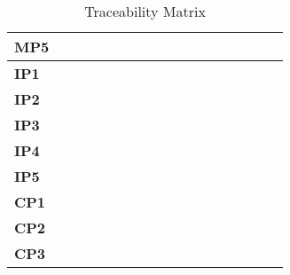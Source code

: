 \documentclass[12pt]{article}
\begin{document}
\begin{table}[H]
\begin{adjustwidth}{-0.1in}{-1in}
{\begin{tabular}{c|c|c|c|c|c|c|c|c|c|c|c|c|c|c|c|c|}
\multicolumn{1}{|l|}{\textbf{MP5}}   &              &              &              &              &              &              &              &              &              &              &              &              &              &              &             &              \\ \hline
\multicolumn{1}{|l|}{\textbf{IP1}}   &              &              &              &              &              &              &              &              &              &              &              &              &              &              &             &              \\ \hline
\multicolumn{1}{|l|}{\textbf{IP2}}   &              &              &              &              &              &              &              &              &              &              &              &              &              &              &             &              \\ \hline
\multicolumn{1}{|l|}{\textbf{IP3}}   &              &              &              &              &              &              &              &              &              &              &              &              &              &              &             &              \\ \hline
\multicolumn{1}{|l|}{\textbf{IP4}}   &              &              &              &              &              &              &              &              &              &              &              &              &              &              &             &              \\ \hline
\multicolumn{1}{|l|}{\textbf{IP5}}   &              &              &              &              &              &              &              &              &              &              &              &              &              &              &             &              \\ \hline
\multicolumn{1}{|l|}{\textbf{CP1}}   &              &              &              &              &              &              &              &              &              &              &              &              &              &              &             &              \\ \hline
\multicolumn{1}{|l|}{\textbf{CP2}}   &              &              &              &              &              &              &              &              &              &              &              &              &              &              &             &              \\ \hline
\multicolumn{1}{|l|}{\textbf{CP3}}   &              &              &              &              &              &              &              &              &              &              &              &              &              &              &             &              \\ \hline
\end{tabular}

}
\caption{Traceability Matrix}
    \label{tab:matrix2}
\end{adjustwidth}
\end{table}
\end{document}

